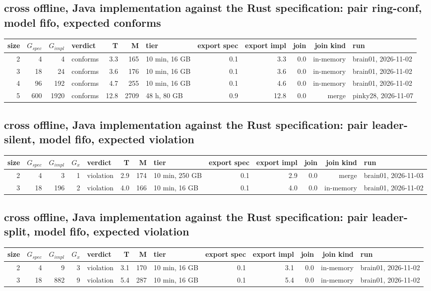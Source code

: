 \documentclass[10pt]{article}
\begin{document}
\subsection*{cross offline, Java implementation against the Rust specification: pair \textsf{ring-conf}, model fifo, expected conforms}
\begin{longtable}{@{}rrrlrrlrrrrl@{}}
\toprule
size & $G_{\mathit{spec}}$ & $G_{\mathit{impl}}$ & verdict & T & M & tier & export spec & export impl & join & join kind & run \\
\midrule
\endhead
\color{red} 2 & 4 & 4 & conforms & 3.3 & 165 & 10 min, 16 GB & 0.1 & 3.3 & 0.0 & in-memory & brain01, 2026-11-02 \\
\color{red} 3 & 18 & 24 & conforms & 3.6 & 176 & 10 min, 16 GB & 0.1 & 3.6 & 0.0 & in-memory & brain01, 2026-11-02 \\
\color{red} 4 & 96 & 192 & conforms & 4.7 & 255 & 10 min, 16 GB & 0.1 & 4.6 & 0.0 & in-memory & brain01, 2026-11-02 \\
\color{red} 5 & 600 & 1920 & conforms & 12.8 & 2709 & 48 h, 80 GB & 0.9 & 12.8 & 0.0 & merge & pinky28, 2026-11-07 \\
\bottomrule
\end{longtable}
\subsection*{cross offline, Java implementation against the Rust specification: pair \textsf{leader-silent}, model fifo, expected violation}
\begin{longtable}{@{}rrrrlrrlrrrrl@{}}
\toprule
size & $G_{\mathit{spec}}$ & $G_{\mathit{impl}}$ & $G_x$ & verdict & T & M & tier & export spec & export impl & join & join kind & run \\
\midrule
\endhead
\color{red} 2 & 4 & 3 & 1 & violation & 2.9 & 174 & 10 min, 250 GB & 0.1 & 2.9 & 0.0 & merge & brain01, 2026-11-03 \\
\color{red} 3 & 18 & 196 & 2 & violation & 4.0 & 166 & 10 min, 16 GB & 0.1 & 4.0 & 0.0 & in-memory & brain01, 2026-11-02 \\
\bottomrule
\end{longtable}
\subsection*{cross offline, Java implementation against the Rust specification: pair \textsf{leader-split}, model fifo, expected violation}
\begin{longtable}{@{}rrrrlrrlrrrrl@{}}
\toprule
size & $G_{\mathit{spec}}$ & $G_{\mathit{impl}}$ & $G_x$ & verdict & T & M & tier & export spec & export impl & join & join kind & run \\
\midrule
\endhead
\color{red} 2 & 4 & 9 & 3 & violation & 3.1 & 170 & 10 min, 16 GB & 0.1 & 3.1 & 0.0 & in-memory & brain01, 2026-11-02 \\
\color{red} 3 & 18 & 882 & 9 & violation & 5.4 & 287 & 10 min, 16 GB & 0.1 & 5.4 & 0.0 & in-memory & brain01, 2026-11-02 \\
\bottomrule
\end{longtable}
\end{document}
